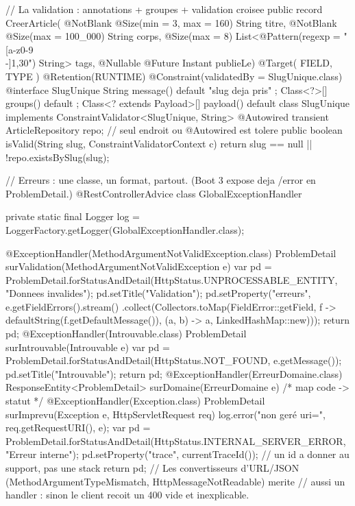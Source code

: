 \begin{codejava}
// La validation : annotations + groupes + validation croisee
public record CreerArticle(
        @NotBlank @Size(min = 3, max = 160) String titre,
        @NotBlank @Size(max = 100_000) String corps,
        @Size(max = 8) List<@Pattern(regexp = "[a-z0-9\\-]{1,30}") String> tags,
        @Nullable @Future Instant publieLe) { }
@Target({ FIELD, TYPE }) @Retention(RUNTIME) @Constraint(validatedBy = SlugUnique.class)
@interface SlugUnique { String message() default "slug deja pris" ; Class<?>[] groups() default { } ; Class<? extends Payload>[] payload() default { } }
class SlugUnique implements ConstraintValidator<SlugUnique, String> {
    @Autowired transient ArticleRepository repo;              // seul endroit ou @Autowired est tolere
    public boolean isValid(String slug, ConstraintValidatorContext c) { return slug == null || !repo.existsBySlug(slug); }
}

// Erreurs : une classe, un format, partout. (Boot 3 expose deja /error en ProblemDetail.)
@RestControllerAdvice
class GlobalExceptionHandler {
    private static final Logger log = LoggerFactory.getLogger(GlobalExceptionHandler.class);

    @ExceptionHandler(MethodArgumentNotValidException.class)
    ProblemDetail surValidation(MethodArgumentNotValidException e) {
        var pd = ProblemDetail.forStatusAndDetail(HttpStatus.UNPROCESSABLE_ENTITY, "Donnees invalides");
        pd.setTitle("Validation"); pd.setProperty("erreurs", e.getFieldErrors().stream()
                .collect(Collectors.toMap(FieldError::getField, f -> defaultString(f.getDefaultMessage()), (a, b) -> a, LinkedHashMap::new)));
        return pd;
    }
    @ExceptionHandler(Introuvable.class)
    ProblemDetail surIntrouvable(Introuvable e) {
        var pd = ProblemDetail.forStatusAndDetail(HttpStatus.NOT_FOUND, e.getMessage()); pd.setTitle("Introuvable"); return pd;
    }
    @ExceptionHandler(ErreurDomaine.class)
    ResponseEntity<ProblemDetail> surDomaine(ErreurDomaine e) { /* map code -> statut */ }
    @ExceptionHandler(Exception.class)
    ProblemDetail surImprevu(Exception e, HttpServletRequest req) {
        log.error("non ger\'e uri={}", req.getRequestURI(), e);
        var pd = ProblemDetail.forStatusAndDetail(HttpStatus.INTERNAL_SERVER_ERROR, "Erreur interne");
        pd.setProperty("trace", currentTraceId());            // un id a donner au support, pas une stack
        return pd;
    }
    // Les convertisseurs d'URL/JSON (MethodArgumentTypeMismatch, HttpMessageNotReadable) merite
    // aussi un handler : sinon le client recoit un 400 vide et inexplicable.
}
\end{codejava}


